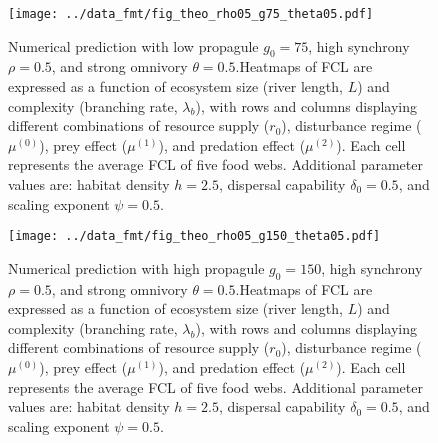 \newpage

\begin{figure}
\centering
\texttt{[image: ../data\_fmt/fig\_theo\_rho05\_g75\_theta05.pdf]}
\caption{\label{fig:fig-num7}Numerical prediction with low propagule
\(g_0 = 75\), high synchrony \(\rho = 0.5\), and strong omnivory
\(\theta = 0.5\).Heatmaps of FCL are expressed as a function of
ecosystem size (river length, \(L\)) and complexity (branching rate,
\(\lambda_b\)), with rows and columns displaying different combinations
of resource supply (\(r_0\)), disturbance regime (\(\mu^{(0)}\)), prey
effect (\(\mu^{(1)}\)), and predation effect (\(\mu^{(2)}\)). Each cell
represents the average FCL of five food webs. Additional parameter
values are: habitat density \(h=2.5\), dispersal capability
\(\delta_0=0.5\), and scaling exponent \(\psi=0.5\).}
\end{figure}

\newpage

\begin{figure}
\centering
\texttt{[image: ../data\_fmt/fig\_theo\_rho05\_g150\_theta05.pdf]}
\caption{\label{fig:fig-num8}Numerical prediction with high propagule
\(g_0 = 150\), high synchrony \(\rho = 0.5\), and strong omnivory
\(\theta = 0.5\).Heatmaps of FCL are expressed as a function of
ecosystem size (river length, \(L\)) and complexity (branching rate,
\(\lambda_b\)), with rows and columns displaying different combinations
of resource supply (\(r_0\)), disturbance regime (\(\mu^{(0)}\)), prey
effect (\(\mu^{(1)}\)), and predation effect (\(\mu^{(2)}\)). Each cell
represents the average FCL of five food webs. Additional parameter
values are: habitat density \(h=2.5\), dispersal capability
\(\delta_0=0.5\), and scaling exponent \(\psi=0.5\).}
\end{figure}

\newpage
